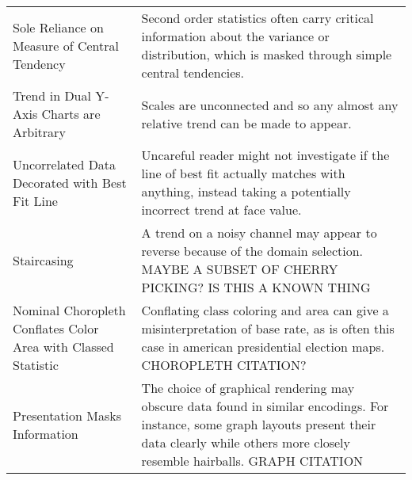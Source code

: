 \begin{table*}[]
\begin{tabular}{p{5cm}p{12cm}}
 \rowcolor{colorc-opaque}Sole Reliance on Measure of Central Tendency & Second order statistics often carry critical information about the variance or distribution, which is masked through simple central tendencies.  \cite{wall2017warning, few2019loom, matejka2017same, anscombe1973graphs}\\
 \rowcolor{colorc}Trend in Dual Y-Axis Charts are Arbitrary & Scales are unconnected and so any almost any relative trend can be made to appear. \cite{KindlmannAlgebraicVisPedagogyPDV2016, cairo2015graphics}\\
 \rowcolor{colorc-opaque}Uncorrelated Data Decorated with Best Fit Line & Uncareful reader might not investigate if the line of best fit actually matches with anything, instead taking a potentially incorrect trend at face value. \\
 \rowcolor{colorc}Staircasing & A trend on a noisy channel may appear to reverse because of the domain selection. MAYBE A SUBSET OF CHERRY PICKING? IS THIS A KNOWN THING\\
 \rowcolor{colorc-opaque}Nominal Choropleth Conflates Color Area with Classed Statistic & Conflating class coloring and area can give a misinterpretation of base rate, as is often this case in american presidential election maps.  \cite{gastner2005maps} CHOROPLETH CITATION?\\
 \rowcolor{colorc}Presentation Masks Information & The choice of graphical rendering may obscure data found in similar encodings. For instance, some graph layouts present their data clearly while others more closely resemble hairballs. \cite{hofmann2012graphical} GRAPH CITATION\\


\end{tabular}
\end{table*}
